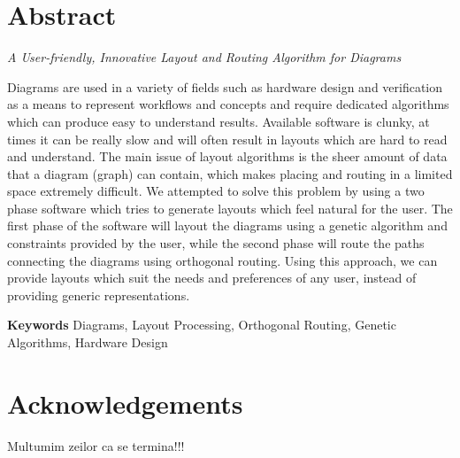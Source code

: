 \chapter*{Abstract}

\emph{A User-friendly, Innovative Layout and Routing Algorithm for Diagrams }

\vspace{\baselineskip}

Diagrams are used in a variety of fields such as hardware design and verification as a means to represent workflows and concepts and require dedicated algorithms which can produce easy to understand results. 
Available software is clunky, at times it can be really slow and will often result in layouts which are hard to read and understand. The main issue of layout algorithms is the sheer amount 
of data that a diagram (graph) can contain, which makes placing and routing in a limited space extremely difficult. We attempted to solve this problem by using a two phase software which tries 
to generate layouts which feel natural for the user. The first phase of the software will layout the diagrams using a genetic algorithm and constraints provided by the user, while the second 
phase will route the paths connecting the diagrams using orthogonal routing. Using this approach, we can provide layouts which suit the needs and preferences of any user, instead of providing 
generic representations.

\vspace{\baselineskip}
\textbf{Keywords} Diagrams, Layout Processing, Orthogonal Routing, Genetic Algorithms, Hardware Design


\chapter*{Acknowledgements}

Multumim zeilor ca se termina!!!
